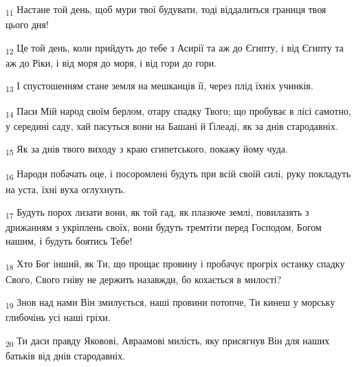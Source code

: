 \begin{tcolorbox}
\textsubscript{11} Настане той день, щоб мури твої будувати, тоді віддалиться границя твоя цього дня!
\end{tcolorbox}
\begin{tcolorbox}
\textsubscript{12} Це той день, коли прийдуть до тебе з Асирії та аж до Єгипту, і від Єгипту та аж до Ріки, і від моря до моря, і від гори до гори.
\end{tcolorbox}
\begin{tcolorbox}
\textsubscript{13} І спустошенням стане земля на мешканців її, через плід їхніх учинків.
\end{tcolorbox}
\begin{tcolorbox}
\textsubscript{14} Паси Мій народ своїм берлом, отару спадку Твого; що пробуває в лісі самотно, у середині саду, хай пасуться вони на Башані й Ґілеаді, як за днів стародавніх.
\end{tcolorbox}
\begin{tcolorbox}
\textsubscript{15} Як за днів твого виходу з краю єгипетського, покажу йому чуда.
\end{tcolorbox}
\begin{tcolorbox}
\textsubscript{16} Народи побачать оце, і посоромлені будуть при всій своїй силі, руку покладуть на уста, їхні вуха оглухнуть.
\end{tcolorbox}
\begin{tcolorbox}
\textsubscript{17} Будуть порох лизати вони, як той гад, як плазюче землі, повилазять з дрижанням з укріплень своїх, вони будуть тремтіти перед Господом, Богом нашим, і будуть боятись Тебе!
\end{tcolorbox}
\begin{tcolorbox}
\textsubscript{18} Хто Бог інший, як Ти, що прощає провину і пробачує прогріх останку спадку Свого, Свого гніву не держить назавжди, бо кохається в милості?
\end{tcolorbox}
\begin{tcolorbox}
\textsubscript{19} Знов над нами Він змилується, наші провини потопче, Ти кинеш у морську глибочінь усі наші гріхи.
\end{tcolorbox}
\begin{tcolorbox}
\textsubscript{20} Ти даси правду Яковові, Авраамові милість, яку присягнув Він для наших батьків від днів стародавніх.
\end{tcolorbox}
